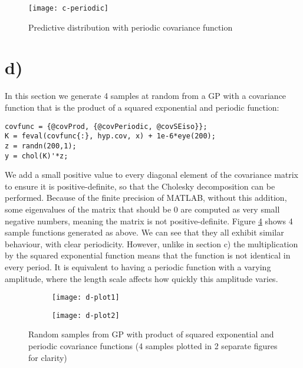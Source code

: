 \documentclass[11pt]{report}
\begin{document}
\begin{figure}[ht]
\centering
\texttt{[image: c-periodic]}
\caption{\label{fig-part-c}Predictive distribution with periodic covariance function}
\end{figure}

\section*{d)}

In this section we generate 4 samples at random from a GP with a covariance function that is the product of a squared exponential and periodic function:
\begin{lstlisting}[basicstyle=\listingsfont]
covfunc = {@covProd, {@covPeriodic, @covSEiso}};
K = feval(covfunc{:}, hyp.cov, x) + 1e-6*eye(200);
z = randn(200,1);
y = chol(K)'*z;
\end{lstlisting}
We add a small positive value to every diagonal element of the covariance matrix to ensure it is positive-definite, so that the Cholesky decomposition can be performed. Because of the finite precision of MATLAB, without this addition, some eigenvalues of the matrix that should be 0 are computed as very small negative numbers, meaning the matrix is not positive-definite. Figure \ref{fig:part-d} shows 4 sample functions generated as above. We can see that they all exhibit similar behaviour, with clear periodicity. However, unlike in section c) the multiplication by the squared exponential function means that the function is not identical in every period. It is equivalent to having a periodic function with a varying amplitude, where the length scale affects how quickly this amplitude varies.

\begin{figure}[ht]
\centering
\begin{subfigure}{.5\linewidth}
  \centering
  \texttt{[image: d-plot1]}
  \caption{\label{fig:part-d-plot1}}
\end{subfigure}%
\begin{subfigure}{.5\linewidth}
  \centering
  \texttt{[image: d-plot2]}
  \caption{\label{fig:part-d-plot2}}
\end{subfigure}
\caption{\label{fig:part-d}Random samples from GP with product of squared exponential and periodic covariance functions (4 samples plotted in 2 separate figures for clarity)}
\end{figure}

\FloatBarrier
\end{document}
